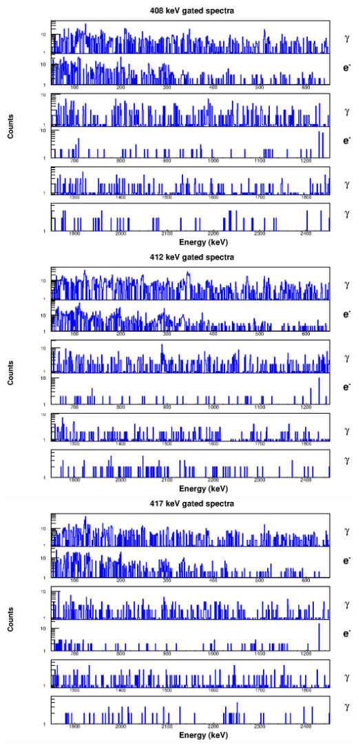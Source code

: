 \begin{landscape}
\includegraphics[scale=1.1]{154Gd_Appendix/408_combined.eps}
\includegraphics[scale=1.1]{154Gd_Appendix/412_combined.eps}
\includegraphics[scale=1.1]{154Gd_Appendix/417_combined.eps}

\end{landscape}
